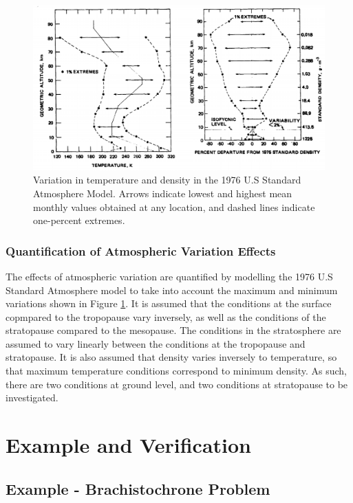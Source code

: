 \begin{figure}[ht]
	\centering
	\includegraphics[width=0.8\linewidth]{figures/A1_uncertainty-analysis/AtmosphericVariation}
	\caption{Variation in temperature and density in the 1976 U.S Standard Atmosphere Model\cite{Administration1976}. Arrows indicate lowest and highest mean monthly values obtained at any location, and dashed lines indicate one-percent extremes.}
	\label{fig:AtmosphericVariation}
\end{figure}

\subsection{Quantification of Atmospheric Variation Effects}

The effects of atmospheric variation are quantified by modelling the 1976 U.S Standard Atmosphere model to take into account the maximum and minimum variations shown in Figure \ref{fig:AtmosphericVariation}. It is assumed that the conditions at the surface copmpared to the tropopause vary inversely, as well as the conditions of the stratopause compared to the mesopause. The conditions in the stratosphere are assumed to vary linearly between the conditions at the tropopause and stratopause. It is also assumed that density varies inversely to temperature, so that maximum temperature conditions correspond to minimum density. As such, there are two conditions at ground level, and two conditions at stratopause to be investigated. 



\chapter{Example and Verification}

\section{Example - Brachistochrone Problem}


